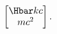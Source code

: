 {\begin{equation}
\begin{aligned}
\begin{bmatrix}
\Hbar k c \\
m c^2
\end{bmatrix}.
\end{aligned}
\end{equation}
%
%
%
%
%
%
%
%
%
%
%
}
